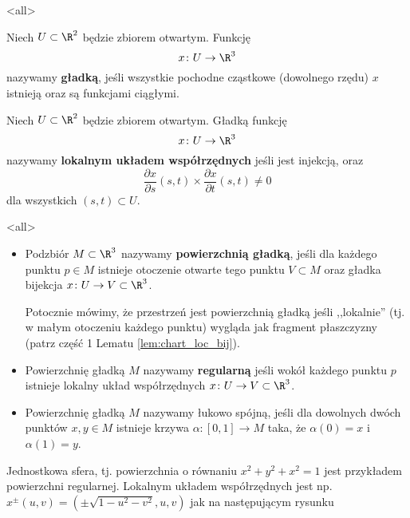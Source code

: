 \mode*
\mode<all>{}

\begin{frame}[<+->]
\begin{definicja}
Niech $U\subset\R^2$ będzie zbiorem otwartym. Funkcję \[x\colon U\to \R^3\] nazywamy \textbf{gładką}, jeśli wszystkie pochodne cząstkowe (dowolnego rzędu) $x$ istnieją oraz są funkcjami ciągłymi.
\end{definicja}

\begin{definicja}
Niech $U\subset \R^2$ będzie zbiorem otwartym. Gładką funkcję
\[x\colon U\to \R^3\]
nazywamy \textbf{lokalnym układem współrzędnych} jeśli jest injekcją, oraz \[\frac{\partial x}{\partial s}(s,t)\times \frac{\partial x}{\partial t}(s,t)\neq 0\] dla wszystkich $(s,t)\subset U$.
\end{definicja}

\end{frame}
\mode<all>{}
\begin{frame}[<+->]

\begin{definicja}\label{def:surface}
\begin{itemize}
\item 
Podzbiór $M\subset \R^3$ nazywamy \textbf{powierzchnią gładką}, jeśli dla każdego punktu $p\in M$ istnieje otoczenie otwarte tego punktu $V\subset M$ oraz gładka bijekcja $x\colon U\to V\subset \R^3$. 

Potocznie mówimy, że przestrzeń jest powierzchnią gładką jeśli ,,lokalnie'' (tj. w małym otoczeniu każdego punktu) wygląda jak fragment płaszczyzny (patrz część 1 Lematu \ref{lem:chart_loc_bij}).

\item Powierzchnię gładką $M$ nazywamy \textbf{regularną} jeśli wokół każdego punktu $p$ istnieje lokalny układ współrzędnych $x\colon U\to V\subset \R^3$. 

\item Powierzchnię gładką $M$ nazywamy łukowo spójną, jeśli dla dowolnych dwóch punktów $x,y\in M$ istnieje krzywa $\alpha\colon [0,1]\to M$ taka, że $\alpha(0)=x$ i $\alpha(1)=y$.
\end{itemize}
\end{definicja}

\end{frame}
\begin{frame}[<+->]

\begin{przyklad}
Jednostkowa sfera, tj. powierzchnia o równaniu $x^2+y^2+x^2=1$ jest przykładem powierzchni regularnej. Lokalnym układem współrzędnych jest np. $x^\pm(u,v)=(\pm\sqrt{1-u^2-v^2},u,v)$ jak na następującym rysunku

\begin{center}

\end{center}
\end{przyklad}

\end{frame}
